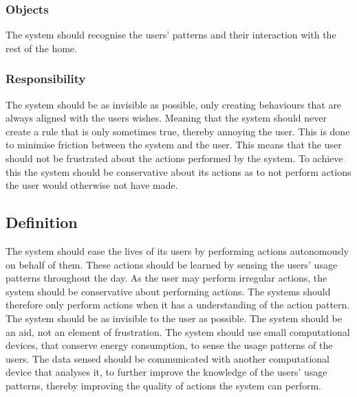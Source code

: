 \subsubsection{Objects}

The system should recognise the users' patterns and their interaction with the
rest of the home.

\subsubsection{Responsibility}

The system should be as invisible as possible, only creating behaviours that are always aligned with the users wishes. Meaning that the system should never create a rule that is only sometimes true, thereby annoying the user. This is done to minimise friction between the system and the user. This means that the user should not be frustrated about the actions performed by the system. To achieve this the system should be conservative about its actions as to not perform actions the user would otherwise not have made.

\subsection{Definition}

The system should ease the lives of its users by performing actions autonomously
on behalf of them. These actions should be learned by sensing the users' usage
patterns throughout the day. As the user may perform irregular actions, the
system should be conservative about performing actions. The systems should
therefore only perform actions when it has a understanding of the action
pattern. The system should be as invisible to the user as possible. The system
should be an aid, not an element of frustration. The system should use small
computational devices, that conserve energy consumption, to sense the usage
patterns of the users. The data sensed should be communicated with another
computational device that analyses it, to further improve the knowledge of the
users' usage patterns, thereby improving the quality of actions the system can perform.
